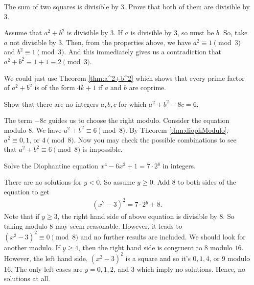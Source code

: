 \documentclass{subfile}
\begin{document}
				\begin{problem}
					The sum of two squares is divisible by $3$. Prove that both of them are divisible by $3$.
				\end{problem}
				
				\begin{solution}
					Assume that $a^2+b^2$ is divisible by $3$. If $a$ is divisible by $3$, so must be $b$. So, take $a$ not divisible by $3$. Then, from the properties above, we have $a^2\equiv1\pmod3$ and $b^2\equiv1\pmod3$. And this immediately gives us a contradiction that $a^2+b^2\equiv1+1\equiv2\pmod3$.
				\end{solution}
				
				\begin{remark}
					We could just use Theorem \ref{thm:a^2+b^2} which shows that every prime factor of $a^2+b^2$ is of the form $4k+1$ if $a$ and $b$ are coprime.
				\end{remark}
				
				\begin{problem}
					Show that there are no integers $a,b,c$ for which $a^2+b^2-8c=6$.
				\end{problem}
				
				\begin{solution}
					The term $-8c$ guides us to choose the right modulo. Consider the equation modulo $8$. We have $a^2+b^2\equiv 6\pmod{8}$. By Theorem \ref{thm:diophModulo}, $a^2\equiv 0, 1$, or  $4\pmod{8}$. Now you may check the possible combinations to see that $a^2+b^2\equiv 6\pmod{8}$ is impossible.
				\end{solution}
				
				\begin{problem}
					Solve the Diophantine equation $x^4-6x^2+1=7 \cdot 2^y$ in integers.
				\end{problem}
				
				\begin{solution}
					There are no solutions for $y<0$. So assume $y\geq 0$. Add $8$ to both sides of the equation to get
						\begin{align*}
							 (x^2-3)^2=7\cdot 2^y+8.
						\end{align*}
					Note that if $y \geq 3$, the right hand side of above equation is divisible by $8$. So taking modulo $8$ may seem reasonable. However, it leads to $(x^2-3)^2 \equiv 0 \pmod 8$ and no further results are included. We should look for another modulo. If $y \geq 4$, then the right hand side is congruent to $8$ modulo $16$. However, the left hand side, $(x^2-3)^2$ is a square and so it's $0, 1, 4$, or $9$ modulo $16$. The only left cases are $y=0,1,2$, and $3$ which imply no solutions. Hence, no solutions at all.
				\end{solution}
				
\end{document}
